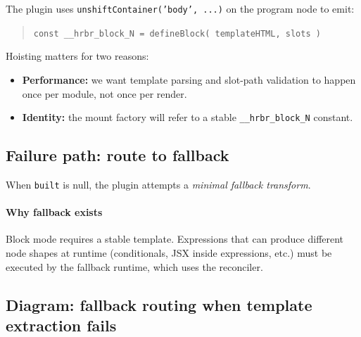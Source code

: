 The plugin uses \texttt{unshiftContainer('body', ...)} on the program node to emit:

\begin{quote}
	\texttt{const \_\_hrbr\_block\_N = defineBlock({ templateHTML, slots })}
\end{quote}

Hoisting matters for two reasons:

\begin{itemize}
\item \textbf{Performance:} we want template parsing and slot-path validation to happen once per module, not once per render.
\item \textbf{Identity:} the mount factory will refer to a stable \texttt{\_\_hrbr\_block\_N} constant.
\end{itemize}

\subsection{Failure path: route to fallback}

When \texttt{built} is null, the plugin attempts a \emph{minimal fallback transform}.

\paragraph{Why fallback exists}

Block mode requires a stable template. Expressions that can produce different node shapes at runtime (conditionals, JSX inside expressions, etc.) must be executed by the fallback runtime, which uses the reconciler.

\subsection*{Diagram: fallback routing when template extraction fails}
\begin{center}
\end{center}

